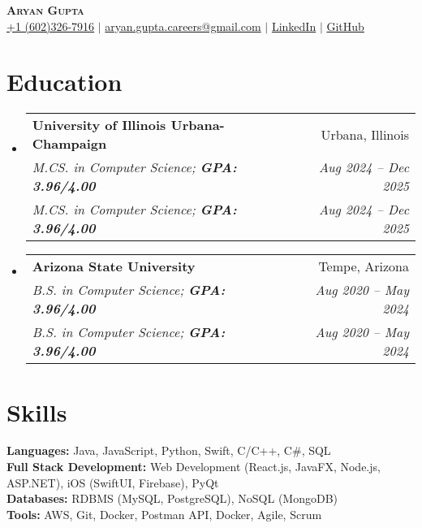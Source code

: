\documentclass[letterpaper,11pt]{article}
\makeatletter
\newcommand{\resumeEducationHeading}[6]{
  \vspace{-2pt}\item
    \begin{tabular*}{0.97\textwidth}[t]{l@{\extracolsep{\fill}}r}
      \textbf{#1} & #2 \\
      \textit{\small#3} & \textit{\small #4} \\
      \textit{\small#5} & \textit{\small #6} \\
    \end{tabular*}\vspace{-5pt}
}
\newcommand{\resumeSubHeadingListStart}{\begin{itemize}[leftmargin=0.15in, label={}]}
\newcommand{\resumeSubHeadingListEnd}{\end{itemize}}
\makeatother
\begin{document}
\begin{center}
  \textbf{\Huge \scshape Aryan Gupta} \\ \vspace{3pt}
  \small
  \faMobile \hspace{.5pt} \href{tel:6023267916}{+1 (602)326-7916}
  $|$
  \faAt \hspace{.5pt} \href{mailto:aryan.gupta.careers@gmail.com}{aryan.gupta.careers@gmail.com}
  $|$
  \faLinkedinSquare \hspace{.5pt} \href{https://www.linkedin.com/in/agupt295}{LinkedIn}
  $|$
  \faGithub \hspace{.5pt} \href{https://github.com/agupt295}{GitHub}
\end{center}

\section{Education}
\resumeSubHeadingListStart
  \resumeEducationHeading
    {University of Illinois Urbana-Champaign}{Urbana, Illinois}
    {M.CS. in Computer Science; \textbf{GPA: 3.96/4.00}}{Aug 2024 -- Dec 2025}
    {M.CS. in Computer Science; \textbf{GPA: 3.96/4.00}}{Aug 2024 -- Dec 2025}
\resumeSubHeadingListEnd

\vspace{-0.4cm} %

\resumeSubHeadingListStart
  \resumeEducationHeading
    {Arizona State University}{Tempe, Arizona}
    {B.S. in Computer Science; \textbf{GPA: 3.96/4.00}}{Aug 2020 -- May 2024}
    {B.S. in Computer Science; \textbf{GPA: 3.96/4.00}}{Aug 2020 -- May 2024}
\resumeSubHeadingListEnd

\section{Skills}
  \resumeSubHeadingListStart
    \small{\item{
      \textbf{Languages:}{ Java, JavaScript, Python, Swift, C/C++, C\#, SQL } \\ \vspace{3pt}
      \textbf{Full Stack Development:}{ Web Development (React.js, JavaFX, Node.js, ASP.NET), iOS (SwiftUI, Firebase), PyQt } \\ \vspace{3pt}
      \textbf{Databases:}{ RDBMS (MySQL, PostgreSQL), NoSQL (MongoDB) } \\ \vspace{3pt}
      \textbf{Tools:}{ AWS, Git, Docker, Postman API, Docker, Agile, Scrum } \\ \vspace{3pt}
    }}
  \resumeSubHeadingListEnd
\end{document}
